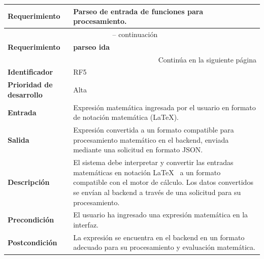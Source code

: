 \begin{longtable}{|m{3.5cm}|m{9.5cm}|}
	\hline
	\rowcolor{black!75} \color{white}\textbf{Requerimiento} & \color{white}\textbf{Parseo de entrada de funciones para procesamiento.} \\
	\hline
	\endfirsthead
	\multicolumn{2}{c}{{\tablename\ \thetable{} -- continuación}} \\
	\hline
	\rowcolor{black!75} \color{white}\textbf{Requerimiento} & \color{white}\textbf{parseo ida} \\
	\hline
	\endhead
	\hline \multicolumn{2}{r}{{Continúa en la siguiente página}} \\
	\endfoot
	\hline
	\endlastfoot
	
	\textbf{Identificador} & RF5 \\
	\hline
	\textbf{Prioridad de desarrollo} & Alta \\
	\hline
	\textbf{Entrada} & Expresión matemática ingresada por el usuario en formato de notación matemática (\LaTeX). \\
	\hline
	\textbf{Salida} & Expresión convertida a un formato compatible para procesamiento matemático en el backend, enviada mediante una solicitud en formato JSON. \\
	\hline
	\textbf{Descripción} & El sistema debe interpretar y convertir las entradas matemáticas en notación \LaTeX~ a un formato compatible con el motor de cálculo. Los datos convertidos se envían al backend a través de una solicitud para su procesamiento. \\
	\hline
	\textbf{Precondición} & El usuario ha ingresado una expresión matemática en la interfaz. \\
	\hline
	\textbf{Postcondición} & La expresión se encuentra en el backend en un formato adecuado para su procesamiento y evaluación matemática. \\
	\hline
\end{longtable}
\caption{Requerimiento funcional No. 5} \label{tabla:RF5}
\vspace{0.5cm}

